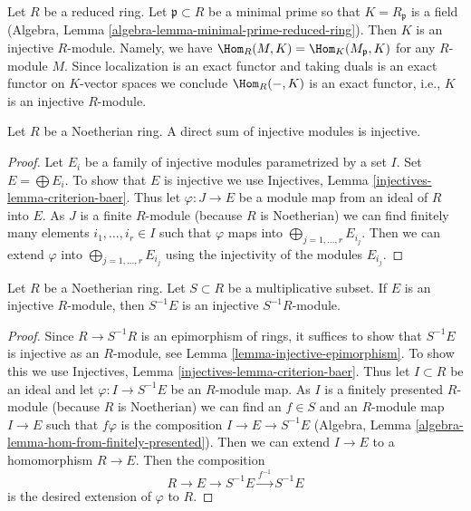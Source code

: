 \begin{example}
\label{example-reduced-ring-injective}
Let $R$ be a reduced ring. Let $\mathfrak p \subset R$ be a minimal prime
so that $K = R_\mathfrak p$ is a field
(Algebra, Lemma \ref{algebra-lemma-minimal-prime-reduced-ring}).
Then $K$ is an injective $R$-module. Namely, we have
$\Hom_R(M, K) = \Hom_K(M_\mathfrak p, K)$ for any $R$-module
$M$. Since localization is an exact functor and taking duals is
an exact functor on $K$-vector spaces we conclude $\Hom_R(-, K)$
is an exact functor, i.e., $K$ is an injective $R$-module.
\end{example}

\begin{lemma}
\label{lemma-sum-injective-modules}
Let $R$ be a Noetherian ring. A direct sum of injective modules
is injective.
\end{lemma}

\begin{proof}
Let $E_i$ be a family of injective modules parametrized by a set $I$.
Set $E = \bigoplus E_i$. To show that $E$ is injective we use
Injectives, Lemma \ref{injectives-lemma-criterion-baer}.
Thus let $\varphi : J \to E$ be a module map from an ideal of $R$
into $E$. As $J$ is a finite $R$-module (because $R$ is Noetherian)
we can find finitely many elements $i_1, \ldots, i_r \in I$
such that $\varphi$ maps into $\bigoplus_{j = 1, \ldots, r} E_{i_j}$.
Then we can extend $\varphi$ into $\bigoplus_{j = 1, \ldots, r} E_{i_j}$
using the injectivity of the modules $E_{i_j}$.
\end{proof}

\begin{lemma}
\label{lemma-localization-injective-modules}
Let $R$ be a Noetherian ring. Let $S \subset R$ be a multiplicative
subset. If $E$ is an injective $R$-module, then $S^{-1}E$ is an
injective $S^{-1}R$-module.
\end{lemma}

\begin{proof}
Since $R \to S^{-1}R$ is an epimorphism of rings, it suffices
to show that $S^{-1}E$ is injective as an $R$-module, see
Lemma \ref{lemma-injective-epimorphism}.
To show this we use Injectives, Lemma \ref{injectives-lemma-criterion-baer}.
Thus let $I \subset R$ be an ideal and let
$\varphi : I \to S^{-1} E$ be an $R$-module map.
As $I$ is a finitely presented $R$-module (because $R$ is Noetherian)
we can find an $f \in S$ and an $R$-module map $I \to E$
such that $f\varphi$ is the composition $I \to E \to S^{-1}E$
(Algebra, Lemma \ref{algebra-lemma-hom-from-finitely-presented}).
Then we can extend $I \to E$ to a homomorphism $R \to E$.
Then the composition
$$
R \to E \to S^{-1}E \xrightarrow{f^{-1}} S^{-1}E
$$
is the desired extension of $\varphi$ to $R$.
\end{proof}


